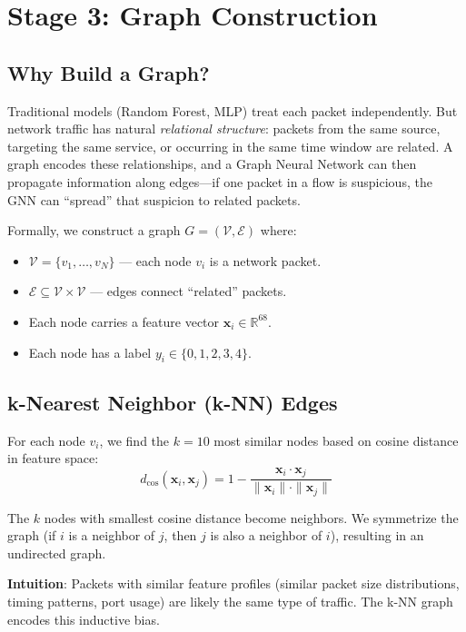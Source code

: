 \documentclass[conference]{IEEEtran}
\newcommand{\R}{\mathbb{R}}
\newcommand{\E}{\mathcal{E}}
\newcommand{\V}{\mathcal{V}}
\newcommand{\vect}[1]{\bm{#1}}
\begin{document}
\section{Stage 3: Graph Construction}
\label{sec:graph}

\subsection{Why Build a Graph?}

Traditional models (Random Forest, MLP) treat each packet independently. But network traffic has natural \emph{relational structure}: packets from the same source, targeting the same service, or occurring in the same time window are related. A graph encodes these relationships, and a Graph Neural Network can then propagate information along edges---if one packet in a flow is suspicious, the GNN can ``spread'' that suspicion to related packets.

Formally, we construct a graph $G = (\V, \E)$ where:
\begin{itemize}
    \item $\V = \{v_1, \ldots, v_N\}$ --- each node $v_i$ is a network packet.
    \item $\E \subseteq \V \times \V$ --- edges connect ``related'' packets.
    \item Each node carries a feature vector $\vect{x}_i \in \R^{68}$.
    \item Each node has a label $y_i \in \{0, 1, 2, 3, 4\}$.
\end{itemize}

\subsection{k-Nearest Neighbor (k-NN) Edges}

For each node $v_i$, we find the $k = 10$ most similar nodes based on cosine distance in feature space:
\begin{equation}
    d_{\cos}(\vect{x}_i, \vect{x}_j) = 1 - \frac{\vect{x}_i \cdot \vect{x}_j}{\|\vect{x}_i\| \cdot \|\vect{x}_j\|}
\end{equation}

The $k$ nodes with smallest cosine distance become neighbors. We symmetrize the graph (if $i$ is a neighbor of $j$, then $j$ is also a neighbor of $i$), resulting in an undirected graph.

\textbf{Intuition}: Packets with similar feature profiles (similar packet size distributions, timing patterns, port usage) are likely the same type of traffic. The k-NN graph encodes this inductive bias.
\end{document}
